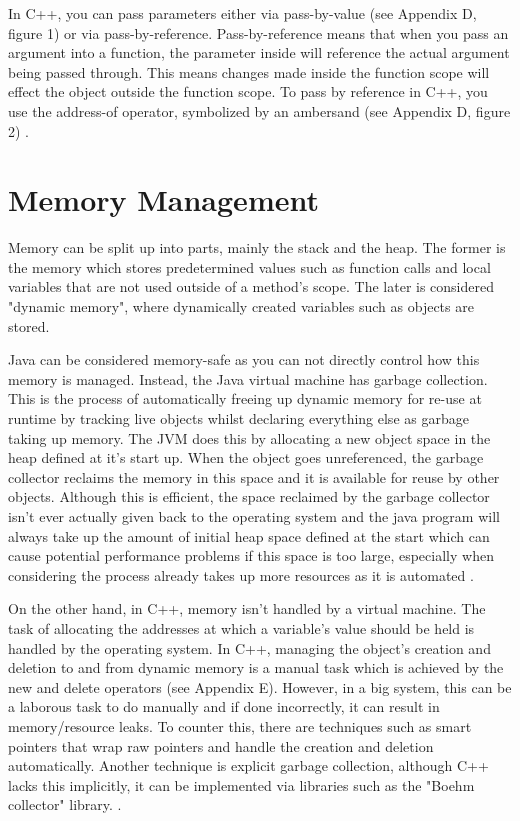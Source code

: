 \documentclass[]{report}
\begin{document}
In C++, you can pass parameters either via pass-by-value (see Appendix D, figure 1) or via pass-by-reference. Pass-by-reference means that when you pass an argument into a function, the parameter inside will reference the actual argument being passed through. This means changes made inside the function scope will effect the object outside the function scope. To pass by reference in C++, you use the address-of operator, symbolized by an ambersand (see Appendix D, figure 2) \cite{ParametersC++}.

\section{Memory Management}

Memory can be split up into parts, mainly the stack and the heap. The former is the memory which stores predetermined values such as function calls and local variables that are not used outside of a method's scope. The later is considered "dynamic memory", where dynamically created variables such as objects are stored.

Java can be considered memory-safe as you can not directly control how this memory is managed. Instead, the Java virtual machine has garbage collection. This is the process of automatically freeing up dynamic memory for re-use at runtime by tracking live objects whilst declaring everything else as garbage taking up memory. The JVM does this by allocating a new object space in the heap defined at it's start up. When the object goes unreferenced, the garbage collector reclaims the memory in this space and it is available for reuse by other objects. Although this is efficient, the space reclaimed by the garbage collector isn't ever actually given back to the operating system and the java program will always take up the amount of initial heap space defined at the start which can cause potential performance problems if this space is too large, especially when considering the process already takes up more resources as it is automated \cite{MemoryJava}.

On the other hand, in C++, memory isn't handled by a virtual machine. The task of allocating the addresses at which a variable's value should be held is handled by the operating system. In C++, managing the object's creation and deletion to and from dynamic memory is a manual task which is achieved by the new and delete operators (see Appendix E). However, in a big system, this can be a laborous task to do manually and if done incorrectly, it can result in memory/resource leaks. To counter this, there are techniques such as smart pointers that wrap raw pointers and handle the creation and deletion automatically. Another technique is explicit garbage collection, although C++ lacks this implicitly, it can be implemented via libraries such as the "Boehm collector" library. \cite{Boehm}. 
\end{document}
